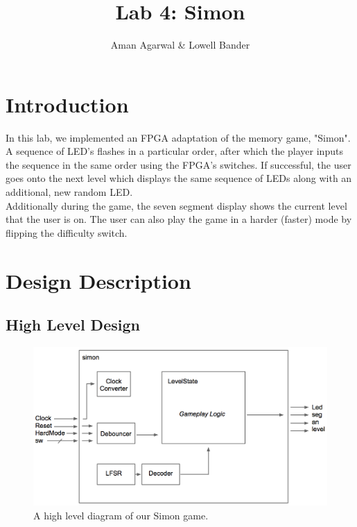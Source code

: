 \documentclass[]{article}
\newcommand{\subtitle}[1]{%
  \posttitle{%
    \par\end{center}
    \begin{center}\large#1\end{center}
    \vskip0.5em}%
}
\begin{document}
\title{Lab 4: Simon}
\subtitle{CS M152A}
\author{Aman Agarwal \& Lowell Bander}

\maketitle
\tableofcontents

\newpage

\section{Introduction}

In this lab, we implemented an FPGA adaptation of the memory game, "Simon". A sequence of LED's flashes in a particular order, after which the player inputs the sequence in the same order using the FPGA's switches. If successful, the user goes onto the next level which displays the same sequence of LEDs along with an additional, new random LED. \\

Additionally during the game, the seven segment display shows the current level that the user is on. The user can also play the game in a harder (faster) mode by flipping the difficulty switch.

\section{Design Description}

\subsection{High Level Design}
\begin{figure}[H]
\centering
\includegraphics[width=\textwidth]{highLevel.png}
\caption{A high level diagram of our Simon game.}
\label{fig:high}
\end{figure}
\end{document}
